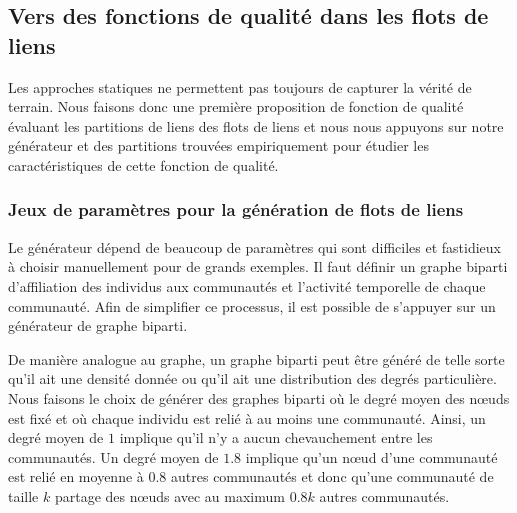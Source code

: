 
\subsection{Vers des fonctions de qualité dans les flots de liens}
\label{sec:versqualite_qualite}

Les approches statiques ne permettent pas toujours de capturer la vérité de terrain.
Nous faisons donc une première proposition de fonction de qualité évaluant les partitions de liens des flots de liens et nous nous appuyons sur notre générateur et des partitions trouvées empiriquement pour étudier les caractéristiques de cette fonction de qualité.





\subsubsection{Jeux de paramètres pour la génération de flots de liens}
\label{subsec:versqualite_qualite_param}
Le générateur dépend de beaucoup de paramètres qui sont difficiles et fastidieux à choisir manuellement pour de grands exemples.
Il faut définir un graphe biparti d'affiliation des individus aux communautés et l'activité temporelle de chaque communauté.
Afin de simplifier ce processus, il est possible de s'appuyer sur un générateur de graphe biparti.

De manière analogue au graphe, un graphe biparti peut être généré de telle sorte qu'il ait une densité donnée ou qu'il ait une distribution des degrés particulière.
Nous faisons le choix de générer des graphes biparti où le degré moyen des n\oe uds est fixé et où chaque individu est relié à au moins une communauté.
Ainsi, un degré moyen de $1$ implique qu'il n'y a aucun chevauchement entre les communautés.
Un degré moyen de $1.8$ implique qu'un n\oe ud d'une communauté est relié en moyenne à $0.8$ autres communautés et donc qu'une communauté de taille $k$ partage des n\oe uds avec au maximum $0.8k$ autres communautés.

